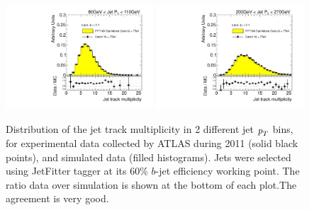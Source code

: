 \begin{figure}[tp]
\centering
\includegraphics[width=0.49\textwidth]{FIGS/dataMCJETFIT/FullDataVarNtrkPT080.pdf}
\includegraphics[width=0.49\textwidth]{FIGS/dataMCJETFIT/FullDataVarNtrkPT200.pdf}
\caption{ Distribution of the jet track multiplicity in 2 different jet ${\emph{p}_{T}}$ bins, for experimental data  collected by ATLAS during 2011 (solid black points), and simulated data (filled histograms). Jets were selected using JetFitter tagger at its 60\% $b$-jet efficiency working point. The ratio data over simulation is shown at the bottom of each plot.The agreement is very good.}
\label{fig:datamcinputvarsNTRKMV170}
\end{figure}
